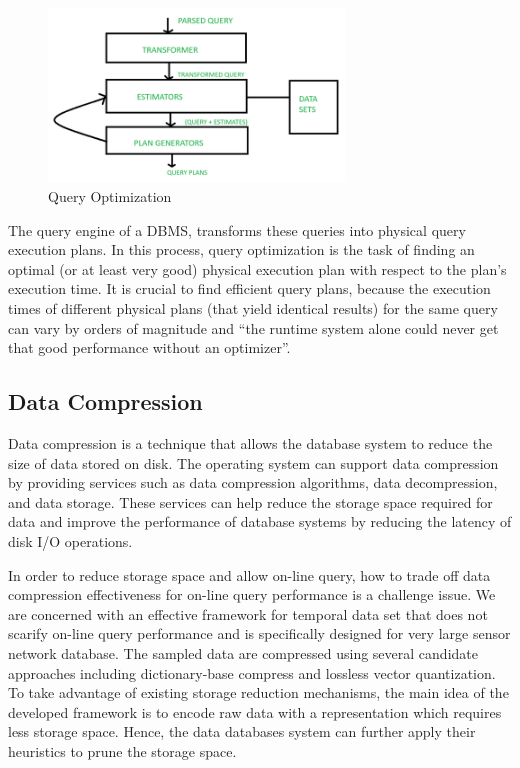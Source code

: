 \documentclass[11pt,a4paper]{article}
\begin{document}
\begin{figure}[h!]
    \centering
    \includegraphics[width=0.7\textwidth]{query.png}
    \caption{Query Optimization}
\end{figure}

The query engine of a DBMS, transforms these queries into physical query execution plans. 
In this process, query optimization is the task of finding an optimal (or at least very good) physical execution plan with respect to the plan’s execution time.
It is crucial to find efficient query plans, because the execution times of different physical plans (that yield identical results) for the same query 
can vary by orders of magnitude and “the runtime system alone could never get that good performance without an optimizer”.\cite{Kossmann2022}

\subsection{Data Compression}

Data compression is a technique that allows the database system to reduce the size of data stored on disk.
The operating system can support data compression by providing services such as data compression algorithms, data decompression, and data storage.
These services can help reduce the storage space required for data and improve the performance of database systems by reducing the latency of disk I/O operations.

In order to reduce storage space and allow on-line query, how to trade off data compression effectiveness for on-line query performance is a challenge issue. 
We are concerned with an effective framework for temporal data set that does not scarify on-line query performance and is specifically designed for very large sensor network database. 
The sampled data are compressed using several candidate approaches including dictionary-base compress and lossless vector quantization. 
To take advantage of existing storage reduction mechanisms, 
the main idea of the developed framework is to encode raw data with a representation which requires less storage space. 
Hence, the data databases system can further apply their heuristics to prune the storage space.\cite{5641312}
\end{document}
